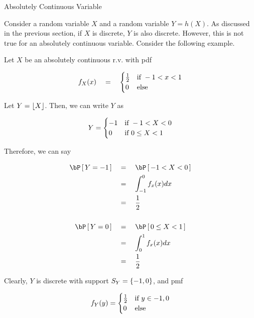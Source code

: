 \documentclass{article}
\begin{document}
\begin{ssection}{Absolutely Continuous Variable}

	Consider a random variable $X$ and a random variable $Y = h(X)$. As discussed in the previous section, if $X$ is discrete, $Y$ is also discrete. However, this is not true for an absolutely continuous variable. Consider the following example.

	\begin{example}
		Let $X$ be an absolutely continuous r.v. with pdf

		\begin{align*}
			f_X(x)	\quad = \quad	\begin{cases}
				\frac 1 2	&	\text{if}\,\, -1 < x < 1 \\
				0			&	\text{else}\,\,
			\end{cases}
		\end{align*}

		Let $Y = \left\lfloor {X} \right\rfloor$. Then, we can write $Y$ as

		\begin{align*}
			Y = \begin{cases}
				-1	&	\text{if}\,\, -1 < X < 0 \\
				0	&	\text{if}\,\,	0 \le X < 1
			\end{cases}
		\end{align*}

		Therefore, we can say

		\begin{align*}
			\prob{Y = -1}	&\eq	\prob{-1 < X < 0} \\
							&\eq	\int_{-1}^0 f_x(x) dx \\
							&\eq	\frac 1 2 \\
			\\
			\prob{Y = 0}	&\eq	\prob{0 \le X < 1} \\
							&\eq	\int_{0}^1 f_x(x) dx \\
							&\eq	\frac 1 2 \\
		\end{align*}

		Clearly, $Y$ is discrete with support $S_Y = \left\{ {-1, 0} \right\}$, and pmf

		\begin{align*}
			f_Y(y) = \begin{cases}
				\frac 1 2	&	\text{if}\,\, y \in {-1, 0} \\
				0			&	\text{else}\,\,
			\end{cases}
		\end{align*}
	\end{example}


\end{ssection}
\end{document}
